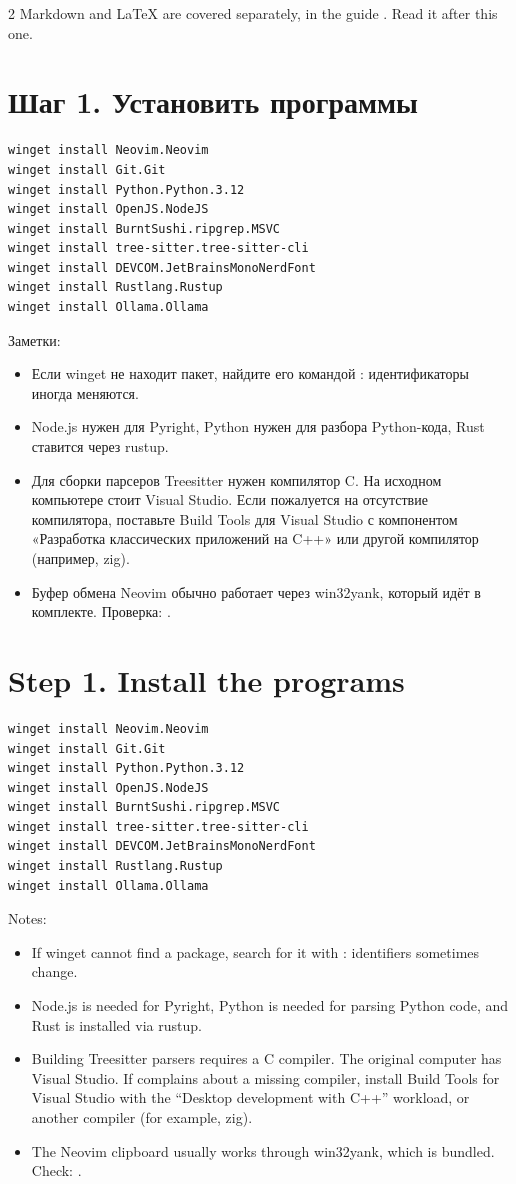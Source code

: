 \begin{paracol}{2}
Markdown and LaTeX are covered separately, in the guide . Read it after this one.
\switchcolumn*

\RU
\section*{Шаг 1. Установить программы}
\begin{lstlisting}
winget install Neovim.Neovim
winget install Git.Git
winget install Python.Python.3.12
winget install OpenJS.NodeJS
winget install BurntSushi.ripgrep.MSVC
winget install tree-sitter.tree-sitter-cli
winget install DEVCOM.JetBrainsMonoNerdFont
winget install Rustlang.Rustup
winget install Ollama.Ollama
\end{lstlisting}
Заметки:
\begin{itemize}\setlength\itemsep{1pt}
\item Если winget не находит пакет, найдите его командой : идентификаторы иногда меняются.
\item Node.js нужен для Pyright, Python нужен для разбора Python-кода, Rust ставится через rustup.
\item Для сборки парсеров Treesitter нужен компилятор C. На исходном компьютере стоит Visual Studio. Если  пожалуется на отсутствие компилятора, поставьте Build Tools для Visual Studio с компонентом «Разработка классических приложений на C++» или другой компилятор (например, zig).
\item Буфер обмена Neovim обычно работает через win32yank, который идёт в комплекте. Проверка: .
\end{itemize}
\switchcolumn
\EN
\section*{Step 1. Install the programs}
\begin{lstlisting}
winget install Neovim.Neovim
winget install Git.Git
winget install Python.Python.3.12
winget install OpenJS.NodeJS
winget install BurntSushi.ripgrep.MSVC
winget install tree-sitter.tree-sitter-cli
winget install DEVCOM.JetBrainsMonoNerdFont
winget install Rustlang.Rustup
winget install Ollama.Ollama
\end{lstlisting}
Notes:
\begin{itemize}\setlength\itemsep{1pt}
\item If winget cannot find a package, search for it with : identifiers sometimes change.
\item Node.js is needed for Pyright, Python is needed for parsing Python code, and Rust is installed via rustup.
\item Building Treesitter parsers requires a C compiler. The original computer has Visual Studio. If  complains about a missing compiler, install Build Tools for Visual Studio with the ``Desktop development with C++'' workload, or another compiler (for example, zig).
\item The Neovim clipboard usually works through win32yank, which is bundled. Check: .
\end{itemize}
\switchcolumn*


\end{paracol}
